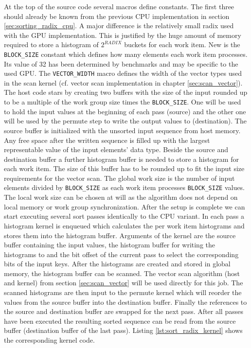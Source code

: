 At the top of the source code several macros define constants. The first three should already be known from the previous CPU implementation in section \ref{sec:sorting_radix_cpu}. A major difference is the relatively small radix used with the GPU implementation. This is justified by the huge amount of memory required to store a histogram of $2^{RADIX}$ buckets for each work item. New is the \lstinline!BLOCK_SIZE! constant which defines how many elements each work item processes. Its value of 32 has been determined by benchmarks and may be specific to the used GPU. The \lstinline!VECTOR_WIDTH! macro defines the width of the vector types used in the scan kernel (cf. vector scan implementation in chapter \ref{sec:scan_vector}). 
The host code stars by creating two buffers with the size of the input rounded up to be a multiple of the work group size times the \lstinline!BLOCK_SIZE!. One will be used to hold the input values at the beginning of each pass (source) and the other one will be used by the permute step to write the output values to (destination). The source buffer is initialized with the unsorted input sequence from host memory. Any free space after the written sequence is filled up with the largest representable value of the input elements' data type.
Beside the source and destination buffer a further histogram buffer is needed to store a histogram for each work item. The size of this buffer has to be rounded up to fit the input size requirements for the vector scan. 
The global work size is the number of input elements divided by \lstinline!BLOCK_SIZE! as each work item processes \lstinline!BLOCK_SIZE! values. The local work size can be chosen at will as the algorithm does not depend on local memory or work group synchronization.
After the setup is complete we can start executing several sort passes identically to the CPU variant. In each pass a histogram kernel is enqueued which calculates the per work item histograms and stores them into the histogram buffer. Arguments of the kernel are the source buffer containing the input values, the histogram buffer for writing the histograms to and the bit offset of the current pass to select the corresponding bits of the input keys. After the histograms are created and stored in global memory, the histogram buffer can be scanned. The vector scan algorithm (host and kernel) from section \ref{sec:scan_vector} will be used directly for this job. The scanned histograms are then input to the permute kernel which will reorder the values from the source buffer into the destination buffer. Finally the references to the source and destination buffer are swapped for the next pass.
After all passes have been executed the resulting sorted sequence can be read from the source buffer (destination buffer of the last pass).
Listing \ref{lst:sort_radix_kernel} shows the corresponding kernel code.

